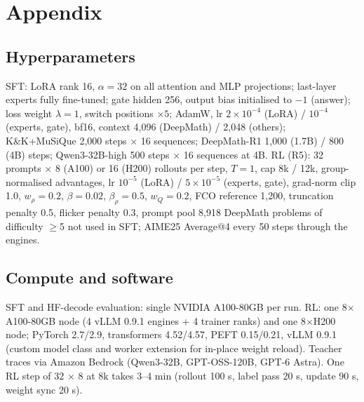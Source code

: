 \documentclass[letterpaper]{article} %
\begin{document}


\appendix
\section{Appendix}
\subsection{Hyperparameters}\label{app:hparams}
SFT: LoRA rank 16, $\alpha{=}32$ on all attention and MLP projections; last-layer experts fully fine-tuned; gate hidden 256, output bias initialised to $-1$ (answer); loss weight $\lambda{=}1$, switch positions $\times 5$; AdamW, lr $2{\times}10^{-4}$ (LoRA) / $10^{-4}$ (experts, gate), bf16, context 4,096 (DeepMath) / 2,048 (others); K\&K+MuSiQue 2,000 steps $\times$ 16 sequences; DeepMath-R1 1,000 (1.7B) / 800 (4B) steps; Qwen3-32B-high 500 steps $\times$ 16 sequences at 4B.
RL (R5): 32 prompts $\times$ 8 (A100) or 16 (H200) rollouts per step, $T{=}1$, cap 8k / 12k, group-normalised advantages, lr $10^{-5}$ (LoRA) / $5{\times}10^{-5}$ (experts, gate), grad-norm clip 1.0, $w_\rho{=}0.2$, $\beta{=}0.02$, $\beta_\rho{=}0.5$, $w_Q{=}0.2$, FCO reference 1,200, truncation penalty 0.5, flicker penalty 0.3, prompt pool 8,918 DeepMath problems of difficulty $\geq$5 not used in SFT; AIME25 Average@4 every 50 steps through the engines.

\subsection{Compute and software}\label{app:infra}
SFT and HF-decode evaluation: single NVIDIA A100-80GB per run. RL: one 8$\times$A100-80GB node (4 vLLM 0.9.1 engines + 4 trainer ranks) and one 8$\times$H200 node; PyTorch 2.7/2.9, transformers 4.52/4.57, PEFT 0.15/0.21, vLLM 0.9.1 (custom model class and worker extension for in-place weight reload). Teacher traces via Amazon Bedrock (Qwen3-32B, GPT-OSS-120B, GPT-6 Astra). One RL step of 32 $\times$ 8 at 8k takes 3--4 min (rollout 100 s, label pass 20 s, update 90 s, weight sync 20 s).
\end{document}
